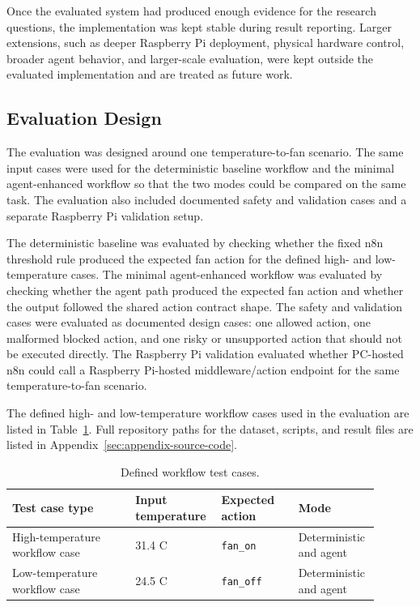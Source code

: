 Once the evaluated system had produced enough evidence for the research questions, the implementation was kept stable during result reporting. Larger extensions, such as deeper Raspberry Pi deployment, physical hardware control, broader agent behavior, and larger-scale evaluation, were kept outside the evaluated implementation and are treated as future work.



\subsection{Evaluation Design}\label{subsec:evaluation-design}

The evaluation was designed around one temperature-to-fan scenario. The same input cases were used for the deterministic baseline workflow and the minimal agent-enhanced workflow so that the two modes could be compared on the same task. The evaluation also included documented safety and validation cases and a separate Raspberry Pi validation setup.

The deterministic baseline was evaluated by checking whether the fixed n8n threshold rule produced the expected fan action for the defined high- and low-temperature cases. The minimal agent-enhanced workflow was evaluated by checking whether the agent path produced the expected fan action and whether the output followed the shared action contract shape. The safety and validation cases were evaluated as documented design cases: one allowed action, one malformed blocked action, and one risky or unsupported action that should not be executed directly. The Raspberry Pi validation evaluated whether PC-hosted n8n could call a Raspberry Pi-hosted middleware/action endpoint for the same temperature-to-fan scenario.

The defined high- and low-temperature workflow cases used in the evaluation are listed in Table~\ref{tab:method-test-cases}. Full repository paths for the dataset, scripts, and result files are listed in Appendix~\ref{sec:appendix-source-code}.

\begin{table}[H]
  \centering
  \caption{Defined workflow test cases.}
  \label{tab:method-test-cases}
  \begin{tabular}{@{}p{0.32\linewidth}p{0.22\linewidth}p{0.20\linewidth}p{0.16\linewidth}@{}}
    \toprule
    Test case type & Input temperature & Expected action & Mode \\
    \midrule
    High-temperature workflow case & 31.4 C & \texttt{fan\_on} & Deterministic and agent \\
    Low-temperature workflow case & 24.5 C & \texttt{fan\_off} & Deterministic and agent \\
    \bottomrule
  \end{tabular}
\end{table}

